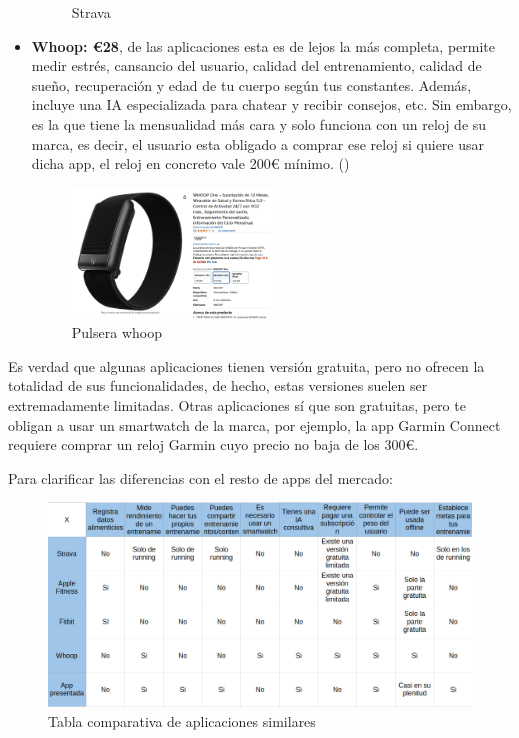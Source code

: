 \begin{itemize}
\begin{figure}[H]
    \caption{Strava}
    \label{fig:Strava}
\end{figure} 
	\item \textbf{Whoop: €28}, de las aplicaciones esta es de lejos la más completa, permite medir estrés, cansancio del usuario, calidad del entrenamiento, calidad de sueño, recuperación y edad de tu cuerpo según tus constantes. Además, incluye una IA especializada para chatear y recibir consejos, etc. Sin embargo, es la que tiene la mensualidad más cara y solo funciona con un reloj de su marca, es decir, el usuario esta obligado a comprar ese reloj si quiere usar dicha app, el reloj en concreto vale 200€ mínimo. (\cite{whoop})
\begin{figure}[H]
   \centering
    \includegraphics[width=0.5\textwidth]{fotos/Pulsera whoop.png}
    \caption{Pulsera whoop}
    \label{fig:Pulsera whoop}
\end{figure} 
\end{itemize}

Es verdad que algunas aplicaciones tienen versión gratuita, pero no ofrecen la totalidad de sus funcionalidades, de hecho, estas versiones suelen ser extremadamente limitadas. Otras aplicaciones sí que son gratuitas, pero te obligan a usar un smartwatch de la marca, por ejemplo, la app Garmin Connect requiere comprar un reloj Garmin cuyo precio no baja de los 300€.

Para clarificar las diferencias con el resto de apps del mercado:

\begin{landscape}
\begin{figure}[H]
   \centering
    \includegraphics[width=1.65\textwidth]{tablas/tabla.png}
    \caption{Tabla comparativa de aplicaciones similares}
    \label{fig:Tabla comparativa}
\end{figure} 
\end{landscape}

